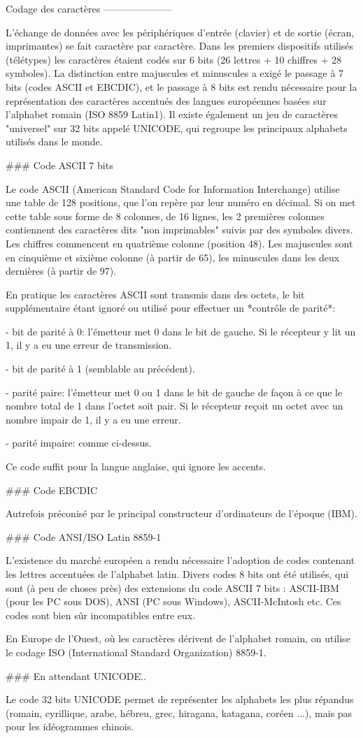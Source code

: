 Codage des caractères
---------------------

L'échange de données avec les périphériques d'entrée (clavier) et de
sortie (écran, imprimantes) se fait caractère par caractère. Dans les
premiers dispositifs utilisés (télétypes) les caractères étaient codés
sur 6 bits (26 lettres + 10 chiffres + 28 symboles). La distinction
entre majuscules et minuscules a exigé le passage à 7 bits (codes ASCII
et EBCDIC), et le passage à 8 bits est rendu nécessaire pour la
représentation des caractères accentués des langues européennes basées
sur l'alphabet romain (ISO 8859 Latin1). Il existe également un jeu de
caractères "universel" sur 32 bits appelé UNICODE, qui regroupe les
principaux alphabets utilisés dans le monde.

### Code ASCII 7 bits

Le code ASCII (American Standard Code for Information Interchange)
utilise une table de 128 positions, que l'on repère par leur numéro en
décimal. Si on met cette table sous forme de 8 colonnes, de 16 lignes,
les 2 premières colonnes contiennent des caractères dits "non
imprimables" suivis par des symboles divers. Les chiffres commencent en
quatrième colonne (position 48). Les majuscules sont en cinquième et
sixième colonne (à partir de 65), les minuscules dans les deux dernières
(à partir de 97).

En pratique les caractères ASCII sont transmis dans des octets, le bit
supplémentaire étant ignoré ou utilisé pour effectuer un *contrôle de
parité*:

-   bit de parité à 0: l'émetteur met 0 dans le bit de gauche. Si le
    récepteur y lit un 1, il y a eu une erreur de transmission.

-   bit de parité à 1 (semblable au précédent).

-   parité paire: l'émetteur met 0 ou 1 dans le bit de gauche de façon à
    ce que le nombre total de 1 dans l'octet soit pair. Si le récepteur
    reçoit un octet avec un nombre impair de 1, il y a eu une erreur.

-   parité impaire: comme ci-dessus.

Ce code suffit pour la langue anglaise, qui ignore les accents.

### Code EBCDIC

Autrefois préconisé par le principal constructeur d'ordinateurs de
l'époque (IBM). 

### Code ANSI/ISO Latin 8859-1

L'existence du marché européen a rendu nécessaire l'adoption de codes
contenant les lettres accentuées de l'alphabet latin. Divers codes 8
bits ont été utilisés, qui sont (à peu de choses près) des extensions du
code ASCII 7 bits : ASCII-IBM (pour les PC sous DOS), ANSI (PC sous
Windows), ASCII-McIntosh etc. Ces codes sont bien sûr incompatibles
entre eux.

En Europe de l'Ouest, où les caractères dérivent de l'alphabet romain,
on utilise le codage ISO (International Standard Organization)
8859-1.

### En attendant UNICODE\...

Le code 32 bits UNICODE permet de représenter
les alphabets les plus répandus (romain, cyrillique, arabe,
hébreu, grec, hiragana, katagana, coréen ...), mais pas pour les
idéogrammes chinois. 
